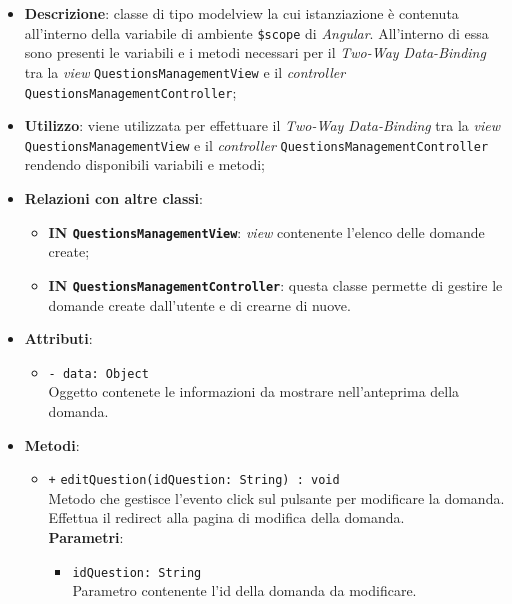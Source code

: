 \begin{itemize}
	\item \textbf{Descrizione}: classe di tipo modelview la cui istanziazione è contenuta all'interno della variabile di ambiente \texttt{\$scope} di \textit{Angular}. All'interno di essa sono presenti le variabili e i metodi necessari per il \textit{Two-Way Data-Binding} tra la \textit{view} \texttt{QuestionsManagementView} e il \textit{controller} \texttt{QuestionsManagementController};
	\item \textbf{Utilizzo}: viene utilizzata per effettuare il \textit{Two-Way Data-Binding} tra la \textit{view} \\\texttt{QuestionsManagementView} e il \textit{controller} \texttt{QuestionsManagementController} rendendo disponibili variabili e metodi;
	\item \textbf{Relazioni con altre classi}: 
	\begin{itemize}
		\item \textbf{IN \texttt{QuestionsManagementView}}: \textit{view} contenente l’elenco delle domande create; 
		\item \textbf{IN \texttt{QuestionsManagementController}}: questa classe permette di gestire le domande create dall’utente e di crearne di nuove.
	\end{itemize}
	\item \textbf{Attributi}: 
	\begin{itemize}
		\item \texttt{- data: Object} \\ Oggetto contenete le informazioni da mostrare nell'anteprima della domanda.
	\end{itemize}
	\item \textbf{Metodi}: 
	\begin{itemize}
		\item \texttt{+} \texttt{editQuestion(idQuestion: String) : void} \\ 
		Metodo che gestisce l'evento click sul pulsante per modificare la domanda. Effettua il redirect alla pagina di modifica della domanda. \\
		\textbf{Parametri}:
		\begin{itemize}
			\item \texttt{idQuestion: String} \\
			Parametro contenente l'id della domanda da modificare.
		\end{itemize}
		

\end{itemize}
\end{itemize}
